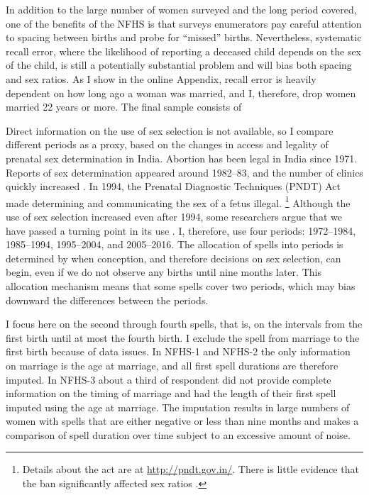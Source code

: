 \documentclass[12pt,letterpaper]{article}
\begin{document}
In addition to the large number of women surveyed and the long period covered, one of the
benefits of the NFHS is that surveys enumerators pay careful attention to spacing between 
births and probe for ``missed'' births.
Nevertheless, systematic recall error, where the likelihood of reporting a deceased 
child depends on the sex of the child, is still a potentially substantial problem and
will bias both spacing and sex ratios.
As I show in the online Appendix, recall error is heavily dependent on how long ago a 
woman was married, and I, therefore, drop women married 22 years or more.
The final sample consists of 


Direct information on the use of sex selection is not available, so I compare different 
periods as a proxy, based on the changes in access and legality of prenatal sex 
determination in India.
Abortion has been legal in India since 1971.
Reports of sex determination appeared around 1982--83, and the number of clinics 
quickly increased \citep{Sudha1999,bhat06,Grover2006}.
In 1994, the Prenatal Diagnostic Techniques (PNDT) Act made determining and communicating 
the sex of a fetus illegal.%
\footnote{
Details about the act are at \href{http://pndt.gov.in/}{http://pndt.gov.in/}.
There is little evidence that the ban significantly affected sex ratios \citep{Das-Gupta2016}.
}
Although the use of sex selection increased even after 1994, some researchers argue that 
we have passed a turning point in its use \citep{Das_Gupta2009,Diamond-Smith2015}.
I, therefore, use four periods: 1972--1984, 1985--1994, 1995--2004, and 2005--2016.
The allocation of spells into periods is determined by when conception, and therefore 
decisions on sex selection, can begin, even if we do not observe any births until nine 
months later. 
This allocation mechanism means that some spells cover two periods, which may bias 
downward the differences between the periods.

I focus here on the second through fourth spells, that is, on the intervals from the first 
birth until at most the fourth birth.
I exclude the spell from marriage to the first birth because of data issues.
In NFHS-1 and NFHS-2 the only information on marriage is the age at marriage, and 
all first spell durations are therefore imputed.
In NFHS-3 about a third of respondent did not provide complete information on the
timing of marriage and had the length of their first spell imputed using the age at 
marriage.
The imputation results in large numbers of women with spells that are either negative or 
less than nine months and makes a comparison of spell duration over time subject to an 
excessive amount of noise.
\end{document}
